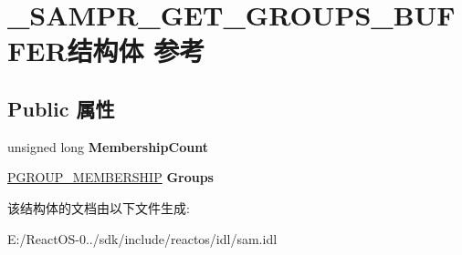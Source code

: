 \hypertarget{struct___s_a_m_p_r___g_e_t___g_r_o_u_p_s___b_u_f_f_e_r}{}\section{\+\_\+\+S\+A\+M\+P\+R\+\_\+\+G\+E\+T\+\_\+\+G\+R\+O\+U\+P\+S\+\_\+\+B\+U\+F\+F\+E\+R结构体 参考}
\label{struct___s_a_m_p_r___g_e_t___g_r_o_u_p_s___b_u_f_f_e_r}
\subsection*{Public 属性}
\begin{DoxyCompactItemize}
\item 
\mbox{\label{struct___s_a_m_p_r___g_e_t___g_r_o_u_p_s___b_u_f_f_e_r_a06f9c41f53f81366a935b944270c84e8}} 
unsigned long {\bfseries Membership\+Count}
\item 
\mbox{\label{struct___s_a_m_p_r___g_e_t___g_r_o_u_p_s___b_u_f_f_e_r_a928834e7628623621d1942557567ad84}} 
\hyperlink{struct___g_r_o_u_p___m_e_m_b_e_r_s_h_i_p}{P\+G\+R\+O\+U\+P\+\_\+\+M\+E\+M\+B\+E\+R\+S\+H\+IP} {\bfseries Groups}
\end{DoxyCompactItemize}


该结构体的文档由以下文件生成\+:\begin{DoxyCompactItemize}
\item 
E\+:/\+React\+O\+S-\/0../sdk/include/reactos/idl/sam.\+idl\end{DoxyCompactItemize}
